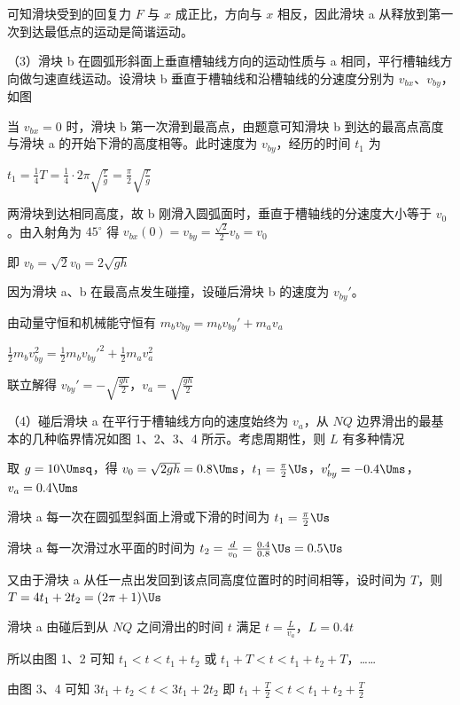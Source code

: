 \documentclass[\gkver]{gaokaozhenti}
\begin{document}
\begin{enumerate}
{可知滑块受到的回复力 $F$ 与 $x$ 成正比，方向与 $x$ 相反，因此滑块 a 从释放到第一次到达最低点的运动是简谐运动。


（3）滑块 b 在圆弧形斜面上垂直槽轴线方向的运动性质与 a 相同，平行槽轴线方向做匀速直线运动。设滑块 b 垂直于槽轴线和沿槽轴线的分速度分别为 $v_{bx}$、$v_{by}$，如图


当 $v_{bx}=0$ 时，滑块 b 第一次滑到最高点，由题意可知滑块 b 到达的最高点高度与滑块 a 的开始下滑的高度相等。此时速度为 $v_{by}$，经历的时间 $t_{1}$ 为

$t_{1}=\frac{1}{4}T=\frac{1}{4}\cdot2\pi\sqrt{\frac{r}{g}}=\frac{\pi}{2}\sqrt{\frac{r}{g}}$

两滑块到达相同高度，故 b 刚滑入圆弧面时，垂直于槽轴线的分速度大小等于 $v_{0}$。由入射角为 $45^{\circ}$ 得 $v_{bx}(0)=v_{by}=\frac{\sqrt{2}}{2}v_{b}=v_{0}$

即 $v_{b}=\sqrt{2}v_{0}=2\sqrt{gh}$

因为滑块 a、b 在最高点发生碰撞，设碰后滑块 b 的速度为 $v_{by}'$。

由动量守恒和机械能守恒有 $m_{b}v_{by}=m_{b}v_{by}'+m_{a}v_{a}$

$\frac{1}{2}m_{b}v_{by}^{2}=\frac{1}{2}m_{b}v_{by}'^{2}+\frac{1}{2}m_{a}v_{a}^{2}$

联立解得 $v_{by}'=-\sqrt{\frac{gh}{2}}$，$v_{a}=\sqrt{\frac{gh}{2}}$

（4）碰后滑块 a 在平行于槽轴线方向的速度始终为 $v_{a}$，从 $NQ$ 边界滑出的最基本的几种临界情况如图 1、2、3、4 所示。考虑周期性，则 $L$ 有多种情况


取 $g=10\Umsq$，得 $v_{0}=\sqrt{2gh}=0.8\Ums$，$t_{1}=\frac{\pi}{2}\Us$，$v_{by}'=-0.4\Ums$，$v_{a}=0.4\Ums$

滑块 a 每一次在圆弧型斜面上滑或下滑的时间为 $t_{1}=\frac{\pi}{2}\Us$

滑块 a 每一次滑过水平面的时间为 $t_{2}=\frac{d}{v_{0}}=\frac{0.4}{0.8}\Us=0.5\Us$

又由于滑块 a 从任一点出发回到该点同高度位置时的时间相等，设时间为 $T$，则 $T=4t_{1}+2t_{2}=(2\pi+1)\Us$

滑块 a 由碰后到从 $NQ$ 之间滑出的时间 $t$ 满足 $t=\frac{L}{v_{a}}$，$L=0.4t$

所以由图 1、2 可知 $t_{1}<t<t_{1}+t_{2}$ 或 $t_{1}+T<t<t_{1}+t_{2}+T$，……

由图 3、4 可知 $3t_{1}+t_{2}<t<3t_{1}+2t_{2}$ 即 $t_{1}+\frac{T}{2}<t<t_{1}+t_{2}+\frac{T}{2}$

}
\end{enumerate}
\end{document}
